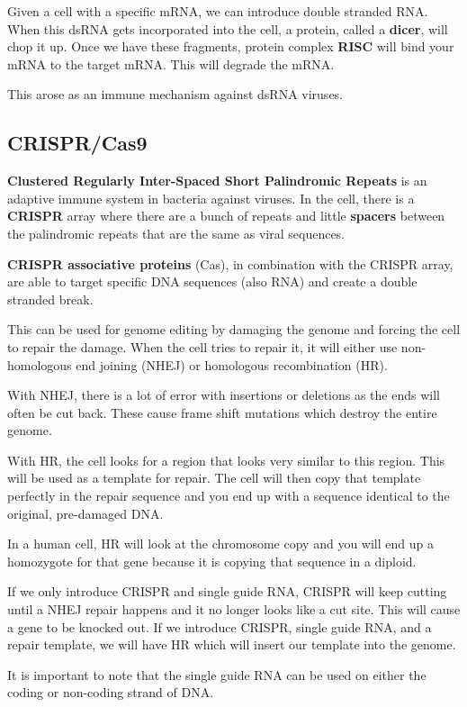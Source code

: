 \documentclass{article}
\begin{document}
Given a cell with a specific mRNA, we can introduce double stranded RNA. When
this dsRNA gets incorporated into the cell, a protein, called a \textbf{dicer},
will chop it up. Once we have these fragments, protein complex \textbf{RISC}
will bind your mRNA to the target mRNA. This will degrade the mRNA.

This arose as an immune mechanism against dsRNA viruses.

\subsection{CRISPR/Cas9}

\textbf{Clustered Regularly Inter-Spaced Short Palindromic Repeats} is an
adaptive immune system in bacteria against viruses. In the cell, there is a
\textbf{CRISPR} array where there are a bunch of repeats and little
\textbf{spacers} between the palindromic repeats that are the same as viral
sequences.

\textbf{CRISPR associative proteins} (Cas), in combination with the CRISPR
array, are able to target specific DNA sequences (also RNA) and create a double
stranded break.

This can be used for genome editing by damaging the genome and forcing the cell
to repair the damage. When the cell tries to repair it, it will either use
non-homologous end joining (NHEJ) or homologous recombination (HR). 

With NHEJ, there is a lot of error with insertions or deletions as the ends will
often be cut back. These cause frame shift mutations which destroy the entire
genome. 

With HR, the cell looks for a region that looks very similar to this region.
This will be used as a template for repair. The cell will then copy that
template perfectly in the repair sequence and you end up with a sequence
identical to the original, pre-damaged DNA.

In a human cell, HR will look at the chromosome copy and you will end up a
homozygote for that gene because it is copying that sequence in a diploid. 

If we only introduce CRISPR and single guide RNA, CRISPR will keep cutting until
a NHEJ repair happens and it no longer looks like a cut site. This will cause a
gene to be knocked out. If we introduce CRISPR, single guide RNA, and a repair
template, we will have HR which will insert our template into the genome.

It is important to note that the single guide RNA can be used on either the
coding or non-coding strand of DNA.
\end{document}
